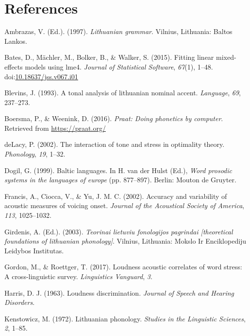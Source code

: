 \documentclass[english,man]{apa6}
\theoremstyle{definition}
\theoremstyle{definition}
\theoremstyle{definition}
\theoremstyle{remark}
\begin{document}
\newpage

\section{References}\label{references}

\setlength{\parindent}{-0.5in} \setlength{\leftskip}{0.5in}

\hypertarget{refs}{}
\hypertarget{ref-Ambrazas97}{}
Ambrazas, V. (Ed.). (1997). \emph{Lithuanian grammar}. Vilnius,
Lithuania: Baltos Lankos.

\hypertarget{ref-R-lme4}{}
Bates, D., Mächler, M., Bolker, B., \& Walker, S. (2015). Fitting linear
mixed-effects models using lme4. \emph{Journal of Statistical Software},
\emph{67}(1), 1--48.
doi:\href{https://doi.org/10.18637/jss.v067.i01}{10.18637/jss.v067.i01}

\hypertarget{ref-Blevins93}{}
Blevins, J. (1993). A tonal analysis of lithuanian nominal accent.
\emph{Language}, \emph{69}, 237--273.

\hypertarget{ref-Praat}{}
Boersma, P., \& Weenink, D. (2016). \emph{Praat: Doing phonetics by
computer}. Retrieved from \url{https://praat.org/}

\hypertarget{ref-deLacy02}{}
deLacy, P. (2002). The interaction of tone and stress in optimality
theory. \emph{Phonology}, \emph{19}, 1--32.

\hypertarget{ref-Dogil99}{}
Dogil, G. (1999). Baltic languages. In H. van der Hulst (Ed.),
\emph{Word prosodic systems in the languages of europe} (pp. 877--897).
Berlin: Mouton de Gruyter.

\hypertarget{ref-Francisetal02}{}
Francis, A., Ciocca, V., \& Yu, J. M. C. (2002). Accuracy and
variability of acoustic measures of voicing onset. \emph{Journal of the
Acoustical Society of America}, \emph{113}, 1025--1032.

\hypertarget{ref-Girdenis03}{}
Girdenis, A. (Ed.). (2003). \emph{Teorinai lietuviu fonologijos
pagrindai {[}theoretical foundations of lithuanian phonology{]}}.
Vilnius, Lithuania: Mokslo Ir Enciklopediju Leidybos Institutas.

\hypertarget{ref-Gordon_Roettger17}{}
Gordon, M., \& Roettger, T. (2017). Loudness acoustic correlates of word
stress: A cross-linguistic survey. \emph{Linguistics Vanguard},
\emph{3}.

\hypertarget{ref-Harris63}{}
Harris, D. J. (1963). Loudness discrimination. \emph{Journal of Speech
and Hearing Disorders}.

\hypertarget{ref-Kenstowicz72}{}
Kenstowicz, M. (1972). Lithuanian phonology. \emph{Studies in the
Linguistic Sciences}, \emph{2}, 1--85.
\end{document}
